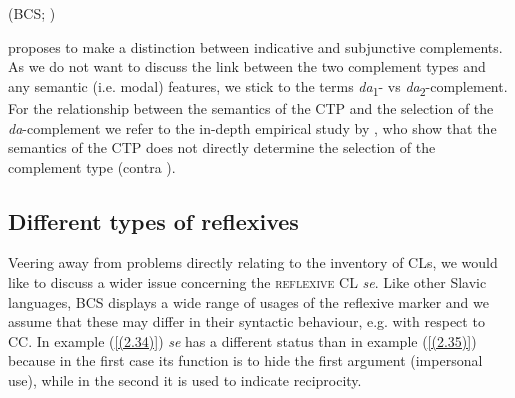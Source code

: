\begin{exe}\ex
\begin{xlist}
\strut\hfill (BCS; \citealt[39]{Browne03})
\end{xlist}
\end{exe}

\noindent \citet{Todorovic15} proposes to make a distinction between indicative and subjunctive complements. As we do not want to discuss the link between the two complement types and any semantic (i.e. modal) features, we stick to the terms \textit{da}\textsubscript{1}- vs \textit{da}\textsubscript{2}-complement. For the relationship between the semantics of the CTP and the selection of the \textit{da}-complement we refer to the in-depth empirical study by \citet*{HWK18}, who show that the semantics of the CTP does not directly determine the selection of the complement type (contra \citealt{Todorovic15}).

\subsection{Different types of reflexives}
\label{Different types of reflexives}
Veering away from problems directly relating to the inventory of CLs, we would like to discuss a wider issue concerning the \textsc{reflexive} CL \textit{se}. Like other Slavic languages, BCS displays a wide range of usages of the reflexive marker and we assume that these may differ in their syntactic behaviour, e.g. with respect to CC. In example (\ref{(2.34)}) \textit{se} has a different status than in example (\ref{(2.35)}) because in the first case its function is to hide the first argument (impersonal use), while in the second it is used to indicate reciprocity. 

